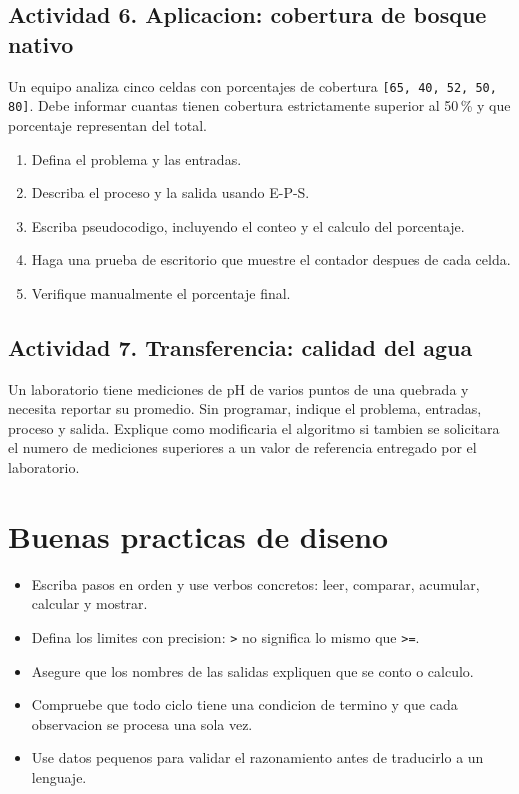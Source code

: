 \documentclass[11pt,a4paper]{article}
\newcommand{\code}[1]{\texttt{#1}}
\begin{document}
\subsection{Actividad 6. Aplicacion: cobertura de bosque nativo}
Un equipo analiza cinco celdas con porcentajes de cobertura \code{[65, 40, 52, 50, 80]}. Debe informar cuantas tienen cobertura estrictamente superior al 50\,\% y que porcentaje representan del total.
\begin{enumerate}
  \item Defina el problema y las entradas.
  \item Describa el proceso y la salida usando E-P-S.
  \item Escriba pseudocodigo, incluyendo el conteo y el calculo del porcentaje.
  \item Haga una prueba de escritorio que muestre el contador despues de cada celda.
  \item Verifique manualmente el porcentaje final.
\end{enumerate}

\subsection{Actividad 7. Transferencia: calidad del agua}
Un laboratorio tiene mediciones de pH de varios puntos de una quebrada y necesita reportar su promedio. Sin programar, indique el problema, entradas, proceso y salida. Explique como modificaria el algoritmo si tambien se solicitara el numero de mediciones superiores a un valor de referencia entregado por el laboratorio.

\section{Buenas practicas de diseno}
\begin{itemize}
  \item Escriba pasos en orden y use verbos concretos: leer, comparar, acumular, calcular y mostrar.
  \item Defina los limites con precision: \code{>} no significa lo mismo que \code{>=}.
  \item Asegure que los nombres de las salidas expliquen que se conto o calculo.
  \item Compruebe que todo ciclo tiene una condicion de termino y que cada observacion se procesa una sola vez.
  \item Use datos pequenos para validar el razonamiento antes de traducirlo a un lenguaje.
\end{itemize}
\end{document}
